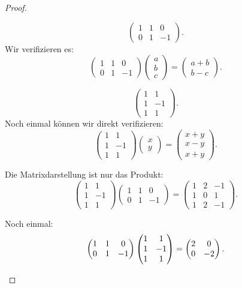 \begin{proof}
	\begin{parts}
	\item 
		\[
			\begin{pmatrix} 1 & 1 & 0 \\0 & 1 & -1 \end{pmatrix} 
		.\] 
		Wir verifizieren es:
		\[
			\begin{pmatrix} 1 & 1 & 0 \\ 0 & 1 & -1 \end{pmatrix} \begin{pmatrix} a \\ b \\ c \end{pmatrix} =\begin{pmatrix} a+b\\b-c \end{pmatrix} 
		.\] 
	\item 
		\[
			\begin{pmatrix} 1 & 1 \\ 1 & -1 \\ 1 & 1 \end{pmatrix} 
		.\] 
		Noch einmal können wir direkt verifizieren:
		\[
			\begin{pmatrix} 1 & 1 \\ 1 & -1 \\ 1 & 1 \end{pmatrix} \begin{pmatrix} x \\ y \end{pmatrix} =\begin{pmatrix} x + y \\ x - y \\ x + y \end{pmatrix} 
		.\] 
	\item Die Matrixdarstellung ist nur das Produkt:
\[
	\begin{pmatrix} 1 & 1 \\ 1 & -1 \\ 1 & 1 \end{pmatrix} \begin{pmatrix} 1 & 1 & 0 \\ 0 & 1 & -1 \end{pmatrix}=\begin{pmatrix} 1 & 2 & -1 \\ 1 & 0 & 1 \\ 1 & 2 & -1 \end{pmatrix}  
.\] 
\item Noch einmal:
	\[
		\begin{pmatrix} 1 & 1 & 0 \\ 0 & 1 & -1 \end{pmatrix} \begin{pmatrix} 1 & 1 \\ 1 & -1 \\ 1 & 1 \end{pmatrix} =\begin{pmatrix} 2 & 0 \\ 0 & -2 \end{pmatrix} 
	.\qedhere\] 
	\end{parts}
\end{proof}

